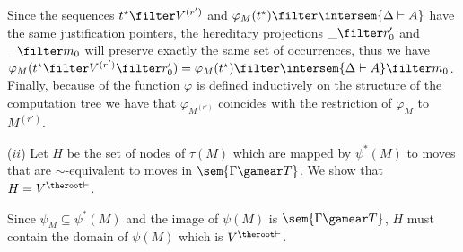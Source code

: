 Since the sequences $t^\star \filter V^{(r')}$ and  $\varphi_M(t^\star) \filter \intersem{\Delta \vdash A }$ have the same justification pointers,
the hereditary projections $\_ \filter r'_0$ and $\_ \filter  m_0$ will preserve exactly the same set of occurrences, thus we have
$\varphi_{M}(t^\star \filter V^{(r')} \filter r'_0) = \varphi_M(t^\star) \filter \intersem{\Delta \vdash A} \filter m_0$.
Finally, because of the function $\varphi$ is defined inductively on the structure of the computation tree we have that $\varphi_{M^{(r')}}$ coincides with the restriction of $\varphi_{M}$ to $M^{(r')}$.


($ii$) Let $H$ be the set of nodes of $\tau(M)$ which are mapped by
$\psi^*(M)$ to moves that are $\sim$-equivalent to moves in
$\sem{\Gamma \gamear T}$. We show that $H = V^{\theroot\vdash}$.

Since $\psi_M \subseteq \psi^*(M)$ and the image of $\psi(M)$ is
$\sem{\Gamma \gamear T}$, $H$ must contain the domain of
$\psi(M)$ which is $V^{\theroot\vdash}$.

